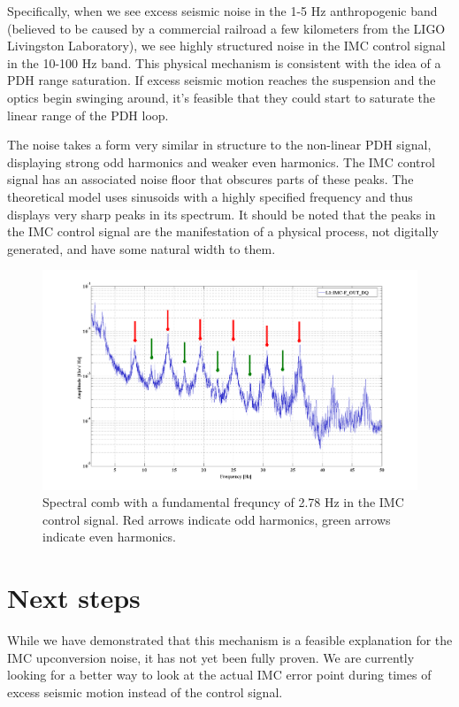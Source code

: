Specifically, when we see excess seismic noise in the 1-5 Hz anthropogenic band (believed to be caused by a commercial railroad a few kilometers from the LIGO Livingston Laboratory), we see highly structured noise in the IMC control signal in the 10-100 Hz band. This physical mechanism is consistent with the idea of a PDH range saturation. If excess seismic motion reaches the suspension and the optics begin swinging around, it's feasible that they could start to saturate the linear range of the PDH loop.

The noise takes a form very similar in structure to the non-linear PDH signal, displaying strong odd harmonics and weaker even harmonics. The IMC control signal has an associated noise floor that obscures parts of these peaks. The theoretical model uses sinusoids with a highly specified frequency and thus displays very sharp peaks in its spectrum. It should be noted that the peaks in the IMC control signal are the manifestation of a physical process, not digitally generated, and have some natural width to them.

\begin{figure}[h!]
\caption[Spectral comb in IMC control signal]{Spectral comb with a fundamental frequncy of 2.78 Hz in the IMC control signal. Red arrows indicate odd harmonics, green arrows indicate even harmonics. }
\includegraphics[height=0.6\textwidth]{figures/IMCUpconversion/upconversion_comb.png}
\end{figure}

\section{Next steps}

While we have demonstrated that this mechanism is a feasible explanation for the IMC upconversion noise, it has not yet been fully proven. We are currently looking for a better way to look at the actual IMC error point during times of excess seismic motion instead of the control signal. 


